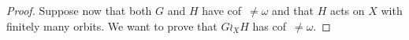 \documentclass[a4paper]{article}
\theoremstyle{definition}
\newcommand{\setst}[2]{\{#1\ |\ #2\}}
\begin{document}
\begin{proof}
Suppose now that both $G$ and $H$ have cof~$\neq\omega$ and that $H$ acts on $X$ with finitely many orbits. We want to prove that $G\wr_XH$ has cof~$\neq\omega$.

\end{proof}
\end{document}
